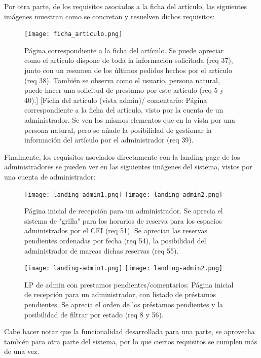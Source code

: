 Por otra parte, de los requisitos asociados a la ficha del artículo, las siguientes imágenes muestran como se concretan y resuelven dichos requisitos:

\begin{figure}[H]
\texttt{[image: ficha\_articulo.png]}
\caption{Página correspondiente a la ficha del artículo. Se puede apreciar como el artículo dispone de toda la información solicitada (req 37), junto con un resumen de los últimos pedidos hechos por el artículo (req 38). También se observa como el usuario, persona natural, puede hacer una solicitud de prestamo por este artículo (req 5 y 40).]
[Ficha del artículo (vista admin)/ comentario: Página correspondiente a la ficha del artículo, visto por la cuenta de un administrador. Se ven los mismos elementos que en la vista por una persona natural, pero se añade la posibilidad de gestionar la información del artículo por el administrador (req 39).} 
\label{FichaArt}
\end{figure}

Finalmente, los requisitos asociados directamente con la landing page de los administradores se pueden ver en las siguientes imágenes del sistema, vistos por una cuenta de administrador:

\begin{figure}[H]
\texttt{[image: landing-admin1.png]}
\texttt{[image: landing-admin2.png]}
\caption{Página inicial de recepción para un administrador. Se aprecia el sistema de "grilla" para los horarios de reserva para los espacios administrados por el CEI (req 51). Se aprecian las reservas pendientes ordenadas por fecha (req 54), la posibilidad del administrador de marcas dichas reservas (req 55).} 
\label{LPAdmin}
\end{figure}


\begin{figure}[H]
\texttt{[image: landing-admin1.png]}
\texttt{[image: landing-admin2.png]}
\caption{LP de admin con prestamos pendientes/comentarios: Página inicial de recepción para un administrador, con listado de préstamos pendientes. Se aprecia el orden de los préstamos pendientes y la posibilidad de filtrar por estado (req 8 y 56).}
\label{LPAdmin2}
\end{figure}

Cabe hacer notar que la funcionalidad desarrollada para una parte, se aprovecha también para otra parte del sistema, por lo que ciertos requisitos se cumplen más de una vez.